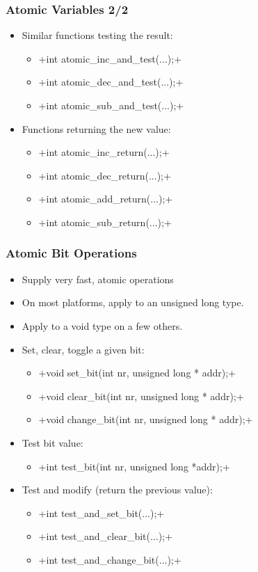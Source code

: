 \begin{frame}[fragile]
  \frametitle{Atomic Variables 2/2}
  \begin{itemize}
  \item Similar functions testing the result:
    \begin{itemize}
    \item {}+int atomic_inc_and_test(...);+
    \item {}+int atomic_dec_and_test(...);+
    \item {}+int atomic_sub_and_test(...);+
    \end{itemize}
  \item Functions returning the new value:
    \begin{itemize}
    \item {}+int atomic_inc_return(...);+
    \item {}+int atomic_dec_return(...);+
    \item {}+int atomic_add_return(...);+
    \item {}+int atomic_sub_return(...);+
    \end{itemize}
  \end{itemize}
\end{frame}

\begin{frame}[fragile]
  \frametitle{Atomic Bit Operations}
  \begin{itemize}
  \item Supply very fast, atomic operations
  \item On most platforms, apply to an unsigned long type.
  \item Apply to a void type on a few others.
  \item Set, clear, toggle a given bit:
    \begin{itemize}
    \item {}+void set_bit(int nr, unsigned long * addr);+
    \item {}+void clear_bit(int nr, unsigned long * addr);+
    \item {}+void change_bit(int nr, unsigned long * addr);+
    \end{itemize}
  \item Test bit value:
    \begin{itemize}
    \item {}+int test_bit(int nr, unsigned long *addr);+
    \end{itemize}
  \item Test and modify (return the previous value):
    \begin{itemize}
    \item {}+int test_and_set_bit(...);+
    \item {}+int test_and_clear_bit(...);+
    \item {}+int test_and_change_bit(...);+
    \end{itemize}
  \end{itemize}
\end{frame}

